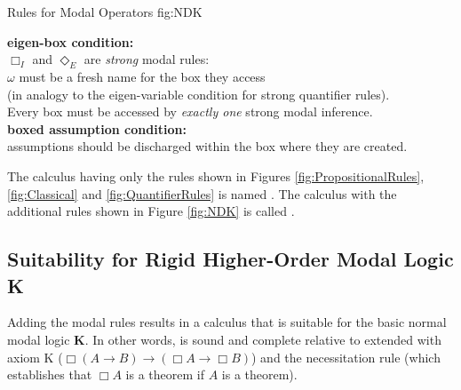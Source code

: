 \documentclass{llncs}
\newcommand{\imp}{\rightarrow}
\newcommand{\nec}{\Box} %
\newcommand{\pos}{\Diamond} %
\begin{document}
\begin{calculus}
{Rules for Modal Operators}
{fig:NDK}

\vspace{1em}

\s\s\s\s
\infer[\nec_I]{\nec A}{\omega: \fbox{\infer*{A}{}} }
\s\s\s\s
\infer[\nec_E]{w: \fbox{ \infer*{}{A} } }{\nec A}

\vspace{2em}

\s\s\s\s
\infer[\pos_I]{\pos A}{w: \fbox{\infer*{A}{}} }
\s\s\s\s
\infer[\pos_E]{\omega: \fbox{ \infer*{}{A} } }{\pos A}

\vspace{1em}


\begin{center}
\textbf{eigen-box condition:}\\ 
$\nec_I$ and $\pos_E$ are \emph{strong} modal rules: \\
$\omega$ must be a fresh name for the box they access \\ 
(in analogy to the eigen-variable condition for strong quantifier rules). \\
Every box must be accessed by \emph{exactly one} strong modal inference. \\
\vspace{0.5em}
\textbf{boxed assumption condition:} \\
assumptions should be discharged within the box where they are created.
\end{center}

\vspace{1em}

\end{calculus}


\noindent
The calculus having only the rules shown in Figures \ref{fig:PropositionalRules}, \ref{fig:Classical} and \ref{fig:QuantifierRules} is named \ND. The calculus with the additional rules shown in Figure \ref{fig:NDK} is called \NDK.


\subsection{Suitability for Rigid Higher-Order Modal Logic K}

Adding the modal rules results in a calculus that is suitable for the basic normal modal logic \textbf{K}.
In other words, {\NDK} is sound and complete relative to {\ND} extended with axiom K ($\nec(A\imp B)\imp (\nec A\imp \nec B)$) and the necessitation rule (which establishes that $\nec A$ is a theorem if $A$ is a theorem).
\end{document}
